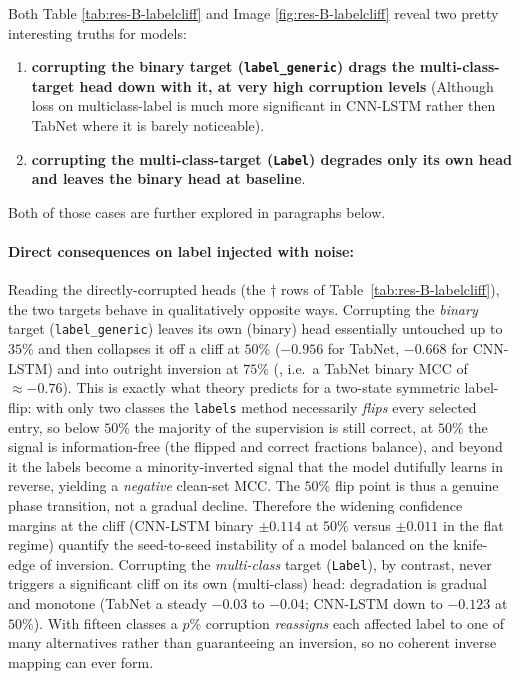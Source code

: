 \documentclass[../main.tex]{subfiles}
\begin{document}
\begin{landscape}
Both Table \ref{tab:res-B-labelcliff} and Image \ref{fig:res-B-labelcliff} reveal two pretty interesting truths for  models: 
\begin{enumerate}
    \item \textbf{corrupting the binary target (\texttt{label\_generic}) drags the multi-class-target head down with it, at very high corruption levels} (Although loss on multiclass-label is much more significant in CNN-LSTM rather then TabNet where it is barely noticeable). 
    \item \textbf{corrupting the multi-class-target (\texttt{Label}) degrades only its own head and leaves the binary head at baseline}.
\end{enumerate}
Both of those cases are further explored in paragraphs below.
\end{landscape}

\paragraph{Direct consequences on label injected with noise:}
Reading the directly-corrupted heads (the $\dagger$ rows of Table~\ref{tab:res-B-labelcliff}), the two targets behave in qualitatively opposite ways. Corrupting the \emph{binary} target (\texttt{label\_generic}) leaves its own (binary) head essentially untouched up to $35\%$ and then collapses it off a cliff at $50\%$ ($-0.956$ for TabNet, $-0.668$ for CNN-LSTM) and into outright inversion at $75\%$ (, i.e.\ a TabNet binary MCC of $\approx -0.76$). This is exactly what theory predicts for a two-state symmetric label-flip: with only two classes the \texttt{labels} method necessarily \emph{flips} every selected entry, so below $50\%$ the majority of the supervision is still correct, at $50\%$ the signal is information-free (the flipped and correct fractions balance), and beyond it the labels become a minority-inverted signal that the model dutifully learns in reverse, yielding a \emph{negative} clean-set MCC. The $50\%$ flip point is thus a genuine phase transition, not a gradual decline. Therefore the widening confidence margins at the cliff (CNN-LSTM binary $\pm0.114$ at $50\%$ versus $\pm0.011$ in the flat regime) quantify the seed-to-seed instability of a model balanced on the knife-edge of inversion. 
Corrupting the \emph{multi-class} target (\texttt{Label}), by contrast, never triggers a significant cliff on its own (multi-class) head: degradation is gradual and monotone (TabNet a steady $-0.03$ to $-0.04$; CNN-LSTM down to $-0.123$ at $50\%$). With fifteen classes a $p\%$ corruption \emph{reassigns} each affected label to one of many alternatives rather than guaranteeing an inversion, so no coherent inverse mapping can ever form. 
\end{document}
